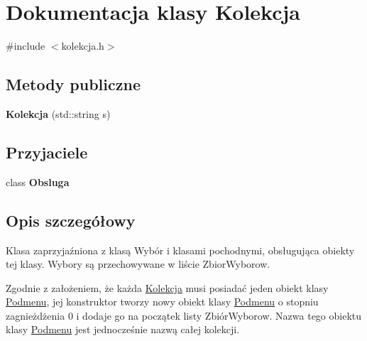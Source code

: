 \hypertarget{classKolekcja}{\section{Dokumentacja klasy Kolekcja}
\label{classKolekcja}
}


{\ttfamily \#include $<$kolekcja.\-h$>$}

\subsection*{Metody publiczne}
\begin{DoxyCompactItemize}
\item 
\hypertarget{classKolekcja_a69ee9233ae5b67dadc29bd8c038e017d}{{\bfseries Kolekcja} (std\-::string s)}\label{classKolekcja_a69ee9233ae5b67dadc29bd8c038e017d}

\end{DoxyCompactItemize}
\subsection*{Przyjaciele}
\begin{DoxyCompactItemize}
\item 
\hypertarget{classKolekcja_aaba4100c363553c323b55344e224e15d}{class {\bfseries Obsluga}}\label{classKolekcja_aaba4100c363553c323b55344e224e15d}

\end{DoxyCompactItemize}


\subsection{Opis szczegółowy}
Klasa zaprzyjaźniona z klasą Wybór i klasami pochodnymi, obsługująca obiekty tej klasy. Wybory są przechowywane w liście Zbior\-Wyborow.

Zgodnie z założeniem, że każda \hyperlink{classKolekcja}{Kolekcja} musi posiadać jeden obiekt klasy \hyperlink{classPodmenu}{Podmenu}, jej konstruktor tworzy nowy obiekt klasy \hyperlink{classPodmenu}{Podmenu} o stopniu zagnieżdżenia 0 i dodaje go na początek listy Zbiór\-Wyborow. Nazwa tego obiektu klasy \hyperlink{classPodmenu}{Podmenu} jest jednocześnie nazwą całej kolekcji. 